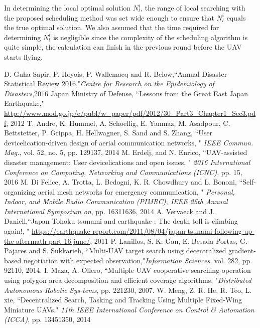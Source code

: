 \documentclass{ieeeaccess}
\begin{document}
In determining the local optimal solution $N_{l}^i$, the range of local searching with the proposed scheduling method was set wide enough to ensure that $N_{l}^i$ equals the true optimal solution. 
We also assumed that the time required for determining $N_{l}^i$ is negligible since the complexity of the scheduling algorithm is quite simple, the calculation can finish in the previous round before the UAV starts flying.

\ifCLASSOPTIONcaptionsoff
  \newpage
\fi

\begin{thebibliography}{1}
D. Guha-Sapir, P. Hoyois, P. Wallemacq and R. Below,``Annual Disaster Statistical Review 2016,"\emph{Centre for Research on
the Epidemiology of Disasters},2016 
 Japan Ministry of Defense, ``Lessons from the Great East Japan Earthquake," \url{http://www.mod.go.jp/e/publ/w_paper/pdf/2012/30_Part3_Chapter1_Sec3.pdf}, 2012
 T. Andre, K. Hummel, A. Schoellig, E. Yanmaz, M. Asadpour, C. Bettstetter, P. Grippa, H. Hellwagner, S. Sand and S. Zhang, ``User devicelication-driven design of aerial communication networks, " \emph{IEEE Commun. Mag.}, vol. 52, no. 5, pp. 129137, 2014
 M. Erdelj, and N. Enrico, ``UAV-assisted disaster management: User devicelications and open issues, " \emph{2016 International Conference on Computing, Networking and Communications (ICNC)}, pp. 15, 2016
 M. Di Felice, A. Trotta, L. Bedogni, K. R. Chowdhury and L. Bononi, ``Self-organizing aerial mesh networks for emergency communication, " \emph{Personal, Indoor, and Mobile Radio Communication (PIMRC), IEEE 25th Annual International Symposium on}, pp. 16311636, 2014
A. Vervaeck and J. Daniell,``Japan Tohoku tsunami and earthquake : The death toll is climbing again!, " \url{https://earthquake-report.com/2011/08/04/japan-tsunami-following-up-the-aftermath-part-16-june/}, 2011
 P. Lanillos, S. K. Gan, E. Besada-Portas, G. Pajares and S. Sukkarieh, ``Multi-UAV target search using decentralized gradient-based negotiation with expected observation,"\emph{Information Sciences}, vol. 282, pp. 92110, 2014.
 I. Maza, A. Ollero, ``Multiple UAV cooperative searching operation
using polygon area decomposition and efficient coverage algorithms, "\emph{Distributed Autonomous Robotic Sys-tems}, pp. 221230, 2007.
 W. Meng, Z. R. He, R. Teo, L. xie, ``Decentralized Search, Tasking and Tracking Using Multiple Fixed-Wing Miniature UAVs," \emph{11th IEEE International Conference on Control \& Automation (ICCA)}, pp. 13451350, 2014 

\end{thebibliography}
\end{document}
